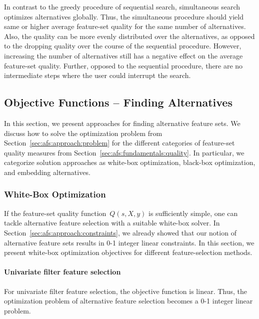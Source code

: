 \documentclass{article}
\theoremstyle{definition}
\begin{document}
In contrast to the greedy procedure of sequential search, simultaneous search optimizes alternatives globally.
Thus, the simultaneous procedure should yield same or higher average feature-set quality for the same number of alternatives.
Also, the quality can be more evenly distributed over the alternatives, as opposed to the dropping quality over the course of the sequential procedure.
However, increasing the number of alternatives still has a negative effect on the average feature-set quality.
Further, opposed to the sequential procedure, there are no intermediate steps where the user could interrupt the search.

\subsection{Objective Functions -- Finding Alternatives}
\label{sec:afs:approach:objectives}

In this section, we present approaches for finding alternative feature sets.
We discuss how to solve the optimization problem from Section~\ref{sec:afs:approach:problem} for the different categories of feature-set quality measures from Section~\ref{sec:afs:fundamentals:quality}.
In particular, we categorize solution approaches as white-box optimization, black-box optimization, and embedding alternatives.

\subsubsection{White-Box Optimization}
\label{sec:afs:approach:objectives:white-box}

If the feature-set quality function~$Q(s,X,y)$ is sufficiently simple, one can tackle alternative feature selection with a suitable white-box solver.
In Section~\ref{sec:afs:approach:constraints}, we already showed that our notion of alternative feature sets results in 0-1 integer linear constraints.
In this section, we present white-box optimization objectives for different feature-selection methods.

\paragraph{Univariate filter feature selection}

For univariate filter feature selection, the objective function is linear.
Thus, the optimization problem of alternative feature selection becomes a 0-1 integer linear problem.
\end{document}
